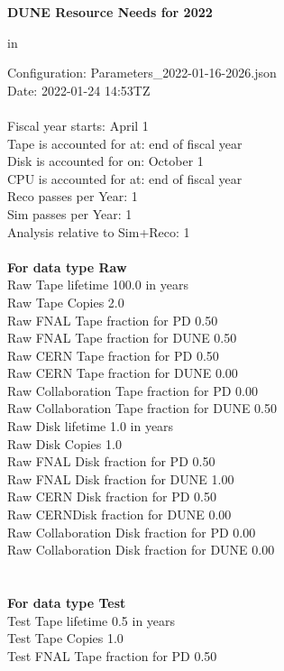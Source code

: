 \documentclass[12pt]{article}
\begin{document}
\centerline{\bf{DUNE Resource Needs for 2022}} in \par Configuration: Parameters\_2022-01-16-2026.json\\
  Date: 2022-01-24 14:53TZ\\
   \\
  
 Fiscal year starts: April 1\\ 
Tape is accounted for at: end of fiscal year\\ 
Disk is accounted for on: October 1\\ 
CPU is accounted for at: end of fiscal year\\ 
Reco passes per Year: 1\\
Sim passes per Year: 1\\
Analysis relative to Sim+Reco: 1\\
\pagebreak
\\
{\bf For data type Raw}\\
   Raw Tape lifetime 100.0 in years\\
   Raw Tape Copies   2.0\\
   Raw FNAL Tape fraction for PD  0.50\\
   Raw FNAL Tape fraction for DUNE  0.50\\
   Raw CERN Tape fraction for PD  0.50\\
   Raw CERN Tape fraction for DUNE  0.00\\
   Raw Collaboration Tape fraction for PD  0.00\\
   Raw Collaboration Tape fraction for DUNE  0.50\\
   Raw Disk lifetime   1.0 in years\\
   Raw Disk Copies   1.0\\
   Raw FNAL Disk fraction for PD  0.50\\
   Raw FNAL Disk fraction for DUNE  1.00\\
   Raw CERN Disk fraction for PD  0.50\\
   Raw CERNDisk fraction for DUNE  0.00\\
   Raw Collaboration Disk fraction for PD  0.00\\
   Raw Collaboration Disk fraction for DUNE  0.00\\
\pagebreak\\
\\
{\bf For data type Test}\\
  Test Tape lifetime   0.5 in years\\
  Test Tape Copies   1.0\\
  Test FNAL Tape fraction for PD  0.50\\
\end{document}
